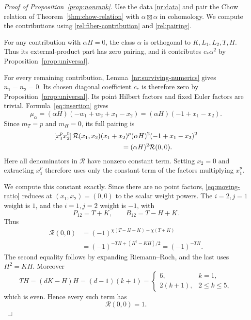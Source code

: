 \begin{proof}[Proof of Proposition~\ref{prop:nonrank}]
Use the data \eqref{nr:data} and pair the Chow relation of
Theorem~\ref{thm:chow-relation} with $\alpha\boxtimes\alpha$ in
cohomology.  We compute the contributions using
\eqref{rel:fiber-contribution} and \eqref{rel:pairing}.

For any contribution with $\alpha H=0$, the class $\alpha$ is
orthogonal to $K,L_1,L_2,T,H$.  Thus its external-product part has
zero pairing, and it contributes $c_*\alpha^2$ by
Proposition~\ref{prop:universal}.

For every remaining contribution, Lemma~\ref{nr:surviving-numerics}
gives $n_1=n_2=0$.  Its chosen diagonal coefficient $c_*$ is therefore
zero by Proposition~\ref{prop:universal}.  Its point Hilbert factors
and fixed Euler factors are trivial.  Formula~\eqref{eq:insertion}
gives
\[
 \mu_\alpha=(\alpha H)(-w_1+w_2+x_1-x_2)
             =(\alpha H)(-1+x_1-x_2).
\]
Since $m_T=p$ and $m_H=0$, its full pairing is
\begin{align*}
 &[x_1^p x_2^0]\,
 \mathcal R(x_1,x_2)(x_1+x_2)^p
           (\alpha H)^2(-1+x_1-x_2)^2\\
 &\hspace{35mm}=(\alpha H)^2\mathcal R(0,0).
\end{align*}
Here all denominators in $\mathcal R$ have nonzero constant term.
Setting $x_2=0$ and extracting $x_1^p$ therefore uses only the constant
term of the factors multiplying $x_1^p$.

We compute this constant exactly.  Since there are no point factors,
\eqref{eq:moving-ratio} reduces at $(x_1,x_2)=(0,0)$ to the scalar
weight powers.  The $i=2,j=1$ weight is $1$, and the $i=1,j=2$
weight is $-1$, with
\[
 P_{12}=T+K,\qquad B_{12}=T-H+K.
\]
Thus
\begin{align*}
 \mathcal R(0,0)
 &=(-1)^{\chi(T-H+K)-\chi(T+K)}\\
 &=(-1)^{-TH+(H^2-KH)/2}
  =(-1)^{-TH}.
\end{align*}
The second equality follows by expanding Riemann--Roch, and the last
uses $H^2=KH$.  Moreover
\[
 TH=(dK-H)H=(d-1)(k+1)
 =\begin{cases}6,&k=1,\\2(k+1),&2\leq k\leq5,\end{cases}
\]
which is even.  Hence every such term has
\begin{equation}\label{nr:moving-constant}
 \mathcal R(0,0)=1.
\end{equation}


\end{proof}

